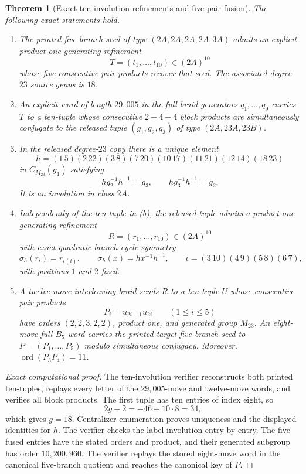 \documentclass[11pt]{article}
\newtheorem{theorem}{Theorem}[section]
\theoremstyle{remark}
\newcommand{\ord}{\operatorname{ord}}
\begin{document}
\begin{theorem}[Exact ten-involution refinements and five-pair fusion]\label{thm:ten-involution}
The following exact statements hold.
\begin{enumerate}[label=\textnormal{(\alph*)},leftmargin=2.4em]
\item The printed five-branch seed of type $(2A,2A,2A,2A,3A)$ admits an explicit product-one generating refinement
\[
 T=(t_1,\ldots,t_{10})\in(2A)^{10}
\]
whose five consecutive pair products recover that seed.  The associated degree-$23$ source genus is $18$.
\item An explicit word of length $29{,}005$ in the full braid generators $q_1,\ldots,q_9$ carries $T$ to a ten-tuple whose consecutive $2+4+4$ block products are simultaneously conjugate to the released tuple $(g_1,g_2,g_3)$ of type $(2A,23A,23B)$.
\item In the released degree-$23$ copy there is a unique element
\[
 h=(1\,5)(2\,22)(3\,8)(7\,20)(10\,17)(11\,21)(12\,14)(18\,23)
\]
in $C_{M_{23}}(g_1)$ satisfying
\[
 h g_2^{-1}h^{-1}=g_3,
 \qquad
 h g_3^{-1}h^{-1}=g_2.
\]
It is an involution in class $2A$.
\item Independently of the ten-tuple in \textnormal{(b)}, the released tuple admits a product-one generating refinement
\[
 R=(r_1,\ldots,r_{10})\in(2A)^{10}
\]
with exact quadratic branch-cycle symmetry
\[
 \sigma_h(r_i)=r_{\iota(i)},
 \qquad
 \sigma_h(x)=h x^{-1}h^{-1},
 \qquad
 \iota=(3\,10)(4\,9)(5\,8)(6\,7),
\]
with positions $1$ and $2$ fixed.
\item A twelve-move interleaving braid sends $R$ to a ten-tuple $U$ whose consecutive pair products
\[
 P_i=u_{2i-1}u_{2i}
 \qquad(1\leq i\leq5)
\]
have orders $(2,2,3,2,2)$, product one, and generated group $M_{23}$.  An eight-move full-$B_5$ word carries the printed target five-branch seed to $P=(P_1,\ldots,P_5)$ modulo simultaneous conjugacy.  Moreover, $\ord(P_3P_4)=11$.
\end{enumerate}
\end{theorem}

\begin{proof}[Exact computational proof]
The ten-involution verifier reconstructs both printed ten-tuples, replays every letter of the $29{,}005$-move and twelve-move words, and verifies all block products.  The first tuple has ten entries of index eight, so
\[
 2g-2=-46+10\cdot8=34,
\]
which gives $g=18$.  Centralizer enumeration proves uniqueness and the displayed identities for $h$.  The verifier checks the label involution entry by entry.  The five fused entries have the stated orders and product, and their generated subgroup has order $10{,}200{,}960$.  The verifier replays the stored eight-move word in the canonical five-branch quotient and reaches the canonical key of $P$.
\end{proof}
\end{document}
